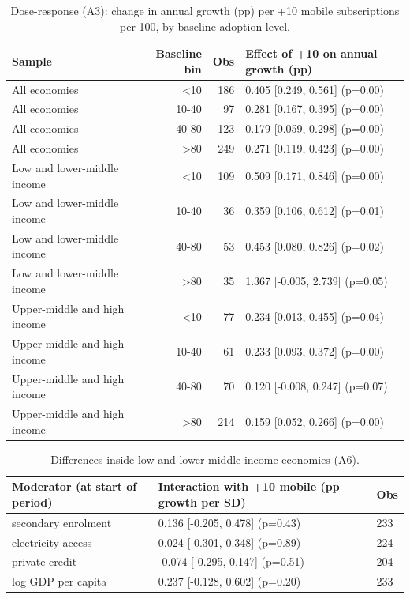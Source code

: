 \begin{table}[!ht]\centering\footnotesize
\caption{Dose-response (A3): change in annual growth (pp) per +10 mobile subscriptions per 100, by baseline adoption level.}\label{tab:a3}
\begin{adjustbox}{max width=\linewidth}\begin{tabular}{@{}lrrp{6.4cm}@{}}\toprule
Sample & Baseline bin & Obs & Effect of +10 on annual growth (pp) \\ \midrule
All economies & <10 & 186 & 0.405 [0.249, 0.561] (p=0.00) \\
All economies & 10-40 & 97 & 0.281 [0.167, 0.395] (p=0.00) \\
All economies & 40-80 & 123 & 0.179 [0.059, 0.298] (p=0.00) \\
All economies & >80 & 249 & 0.271 [0.119, 0.423] (p=0.00) \\
Low and lower-middle income & <10 & 109 & 0.509 [0.171, 0.846] (p=0.00) \\
Low and lower-middle income & 10-40 & 36 & 0.359 [0.106, 0.612] (p=0.01) \\
Low and lower-middle income & 40-80 & 53 & 0.453 [0.080, 0.826] (p=0.02) \\
Low and lower-middle income & >80 & 35 & 1.367 [-0.005, 2.739] (p=0.05) \\
Upper-middle and high income & <10 & 77 & 0.234 [0.013, 0.455] (p=0.04) \\
Upper-middle and high income & 10-40 & 61 & 0.233 [0.093, 0.372] (p=0.00) \\
Upper-middle and high income & 40-80 & 70 & 0.120 [-0.008, 0.247] (p=0.07) \\
Upper-middle and high income & >80 & 214 & 0.159 [0.052, 0.266] (p=0.00) \\
\bottomrule\end{tabular}\end{adjustbox}\end{table}

\begin{table}[!ht]\centering\footnotesize
\caption{Differences inside low and lower-middle income economies (A6).}\label{tab:a6}
\begin{adjustbox}{max width=\linewidth}\begin{tabular}{@{}lll@{}}\toprule
Moderator (at start of period) & Interaction with +10 mobile (pp growth per SD) & Obs \\ \midrule
secondary enrolment & 0.136 [-0.205, 0.478] (p=0.43) & 233 \\
electricity access & 0.024 [-0.301, 0.348] (p=0.89) & 224 \\
private credit & -0.074 [-0.295, 0.147] (p=0.51) & 204 \\
log GDP per capita & 0.237 [-0.128, 0.602] (p=0.20) & 233 \\
\bottomrule\end{tabular}\end{adjustbox}\end{table}

